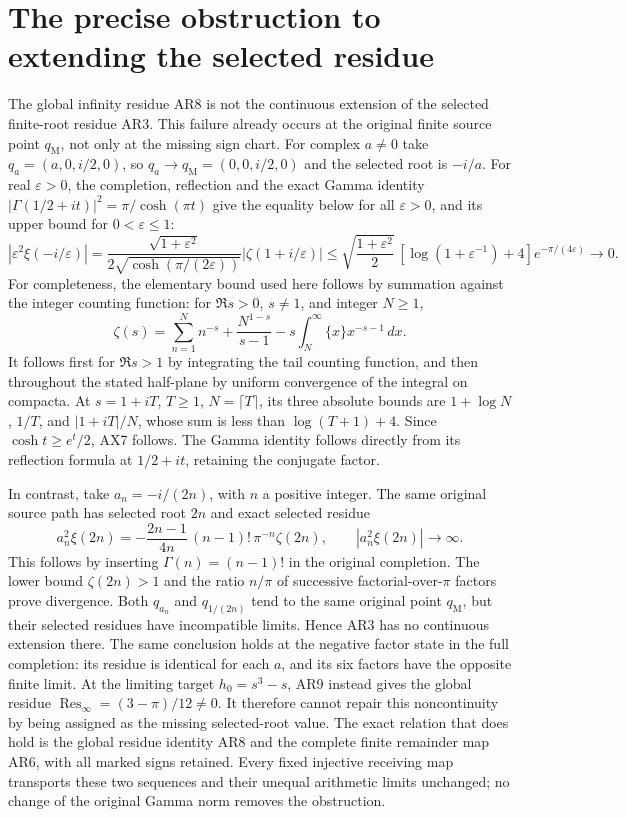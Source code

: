 \documentclass[11pt]{article}
\newcommand{\Res}{\operatorname{Res}}
\begin{document}
\section{The precise obstruction to extending the selected residue}
The global infinity residue AR8 is not the continuous extension
of the selected finite-root residue AR3. This failure already
occurs at the original finite source point $q_{\mathrm M}$,
not only at the missing sign chart. For complex $a\ne0$ take
$q_a=(a,0,i/2,0)$, so $q_a\to q_{\mathrm M}=(0,0,i/2,0)$
and the selected root is $-i/a$. For real $\varepsilon>0$,
the completion, reflection and the exact Gamma identity
$|\Gamma(1/2+it)|^2=\pi/\cosh(\pi t)$ give the equality
below for all $\varepsilon>0$, and its upper bound for
$0<\varepsilon\le1$:
\begin{equation}
\left|\varepsilon^2\xi(-i/\varepsilon)\right|
=\frac{\sqrt{1+\varepsilon^2}}
       {2\sqrt{\cosh(\pi/(2\varepsilon))}}
 |\zeta(1+i/\varepsilon)|
\le\sqrt{\frac{1+\varepsilon^2}{2}}\,
 [\log(1+\varepsilon^{-1})+4]e^{-\pi/(4\varepsilon)}
\longrightarrow0 .
\tag{AX7}
\end{equation}
For completeness, the elementary bound used here follows by
summation against the integer counting function: for $\Re s>0$,
$s\ne1$, and integer $N\ge1$,
\[
\zeta(s)=\sum_{n=1}^{N}n^{-s}
       +\frac{N^{1-s}}{s-1}
       -s\int_N^\infty\{x\}x^{-s-1}\,dx .
\]
It follows first for $\Re s>1$ by integrating the tail counting
function, and then throughout the stated half-plane by uniform
convergence of the integral on compacta. At $s=1+iT$, $T\ge1$,
$N=\lceil T\rceil$, its three absolute bounds are
$1+\log N$, $1/T$, and $|1+iT|/N$, whose sum is less than
$\log(T+1)+4$. Since $\cosh t\ge e^t/2$, AX7 follows.
The Gamma identity follows directly from its reflection
formula at $1/2+it$, retaining the conjugate factor.

In contrast, take $a_n=-i/(2n)$, with $n$ a positive integer.
The same original source path has selected root $2n$ and
exact selected residue
\begin{equation}
a_n^2\xi(2n)
=-\frac{2n-1}{4n}\,(n-1)!\,\pi^{-n}\zeta(2n),
\qquad |a_n^2\xi(2n)|\longrightarrow\infty.
\tag{AX8}
\end{equation}
This follows by inserting $\Gamma(n)=(n-1)!$ in the original
completion. The lower bound $\zeta(2n)>1$ and the ratio
$n/\pi$ of successive factorial-over-$\pi$ factors prove
divergence. Both $q_{a_n}$ and $q_{1/(2n)}$ tend to the
same original point $q_{\mathrm M}$, but their selected
residues have incompatible limits. Hence AR3 has no continuous
extension there. The same conclusion holds at the negative
factor state in the full completion: its residue is identical
for each $a$, and its six factors have the opposite finite limit.
At the limiting target $h_0=s^3-s$, AR9 instead gives the
global residue $\Res_\infty=(3-\pi)/12\ne0$.
It therefore cannot repair this noncontinuity by being assigned
as the missing selected-root value. The exact relation that
does hold is the global residue identity AR8 and the complete
finite remainder map AR6, with all marked signs retained.
Every fixed injective receiving map transports these two
sequences and their unequal arithmetic limits unchanged;
no change of the original Gamma norm removes the obstruction.
\end{document}
